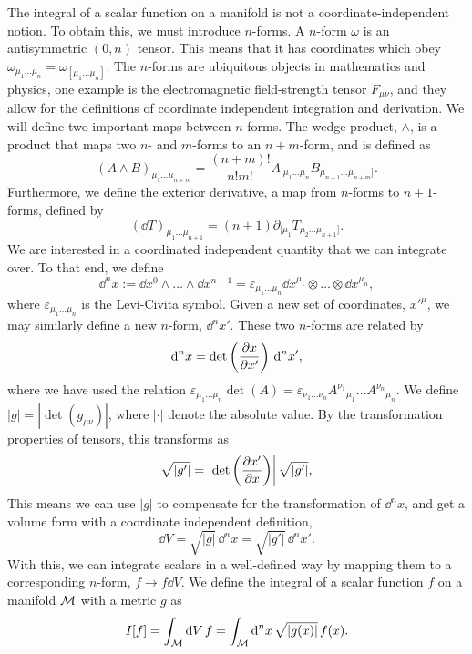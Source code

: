 The integral of a scalar function on a manifold is not a coordinate-independent notion.
To obtain this, we must introduce $n$-forms.
A $n$-form $\omega$ is an antisymmetric $(0, n)$ tensor.
This means that it has coordinates which obey $\omega_{\mu_1 \dots \mu_n} = \omega_{[\mu_1 \dots \mu_n]}$.
The $n$-forms are ubiquitous objects in mathematics and physics, one example is the electromagnetic field-strength tensor $F_{\mu \nu}$, and they allow for the definitions of coordinate independent integration and derivation.
We will define two important maps between $n$-forms.
The wedge product, $\wedge$, is a product that maps two $n$- and $m$-forms to an $n+m$-form, and is defined as
%
\begin{equation}
    (A\wedge B)_{\mu_1\dots\mu_{n+m}} = \frac{(n + m)!}{n! m!} A_{[\mu_1\dots\mu_n}B_{\mu_{n+1}\dots\mu_{n+m}]}.
\end{equation}
%
Furthermore, we define the exterior derivative, a map from $n$-forms to $n+1$-forms, defined by
%
\begin{equation}
    (\dd T)_{\mu_1 \dots \mu_{n+1}} = (n+1) \partial_{[\mu_1} T_{\mu_2\dots\mu_{n+1}]}.
\end{equation}
%
We are interested in a coordinated independent quantity that we can integrate over.
To that end, we define
%
\begin{equation}
    \dd^n x := \dd x^0 \wedge \dots \wedge \dd x^{n-1}
    = \varepsilon_{\mu_1 \dots \mu_n}  
    \dd x^{\mu_1} \otimes \dots \otimes \dd x^{\mu_n},
\end{equation}
%
where $\varepsilon_{\mu_1 \dots \mu_n}$ is the Levi-Civita symbol.
Given a new set of coordinates, $x'^\mu$, we may similarly define a new $n$-form, $\dd^n x'$.
These two $n$-forms are related by
%
\begin{equation}
    \text{d}^n x = \det\left( \pdv{x}{x'} \right) \, \text{d}^n x',
\end{equation}
%
where we have used the relation $\varepsilon_{\mu_1 \dots \mu_n}  \det(A) = \varepsilon_{\nu_1 \dots \nu_n} A^{\nu_1}{}_{\mu_1} \dots A^{\nu_n}{}_{\mu_n}$.  
We define $|g| = |\det(g_{\mu \nu })|$, where $|\cdot|$ denote the absolute value.
By the transformation properties of tensors, this transforms as
%
\begin{equation}
    \sqrt{|g'|} = \left| \det\left(\pdv{x'}{x} \right) \right| \sqrt{|g'|},
\end{equation}
%
This means we can use $|g|$ to compensate for the transformation of $\dd^n x$, and get a volume form with a coordinate independent definition,
%
\begin{equation}
    \dd V = \sqrt{|g|} \, \dd^n x = \sqrt{|g'|} \, \dd^n x'.
\end{equation}
%
With this, we can integrate scalars in a well-defined way by mapping them to a corresponding $n$-form, $f \rightarrow f \dd V$.
We define the integral of a scalar function $f$ on a manifold $\mathcal{M}$ with a metric $g$ as
%
\begin{equation}
    I[f] = \int_{\mathcal{M}} \text{d} V \, f =  \int_{\mathcal{M}} \text{d}^n x \, \sqrt{|g(x)|} \, f(x).  
\end{equation}


